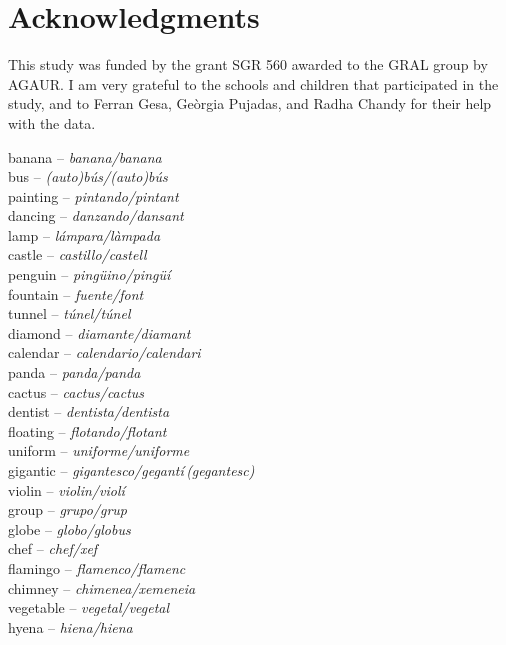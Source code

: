 \documentclass[output=paper,modfonts,nonflat,newtxmath]{langsci/langscibook}
\begin{document}
\section*{Acknowledgments}

{This study was funded by the grant SGR 560 awarded to the GRAL group by AGAUR. I am very grateful to the schools and children that participated in the study, and to Ferran Gesa, Geòrgia Pujadas, and Radha Chandy for their help with the data.}



\begin{multicols}{2}\noindent
banana  – \textit{banana/banana} \\
bus  – \textit{(auto)bús/(auto)bús}\\
painting  – \textit{pintando/pintant}\\
dancing  – \textit{danzando/dansant}\\
lamp  – \textit{lámpara/làmpada}\\
castle  – \textit{castillo/castell}\\
penguin  – \textit{pingüino/pingüí}\\
fountain  – \textit{fuente/font}\\
tunnel  – \textit{túnel/túnel} \\
diamond  – \textit{diamante/diamant} \\
calendar  – \textit{calendario/calendari} \\
panda  – \textit{panda/panda}\\
cactus  – \textit{cactus/cactus}\\
dentist  – \textit{dentista/dentista} \\
floating  – \textit{flotando/flotant} \\
uniform  – \textit{uniforme/uniforme} \\
gigantic – \textit{gigantesco/gegantí\,(gegantesc)}\\
violin  – \textit{violin/violí} \\
group  – \textit{grupo/grup} \\
globe  – \textit{globo/globus} \\
chef  – \textit{chef/xef} \\
flamingo  – \textit{flamenco/flamenc} \\
chimney  – \textit{chimenea/xemeneia} \\
vegetable  – \textit{vegetal/vegetal} \\
hyena  – \textit{hiena/hiena} \\

\end{multicols}
\end{document}
